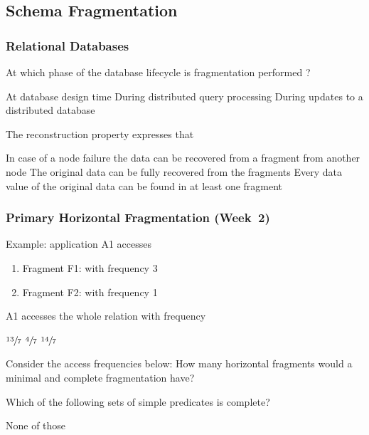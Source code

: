 \documentclass[12pt,a4paper,answers]{exam} %
\begin{document}
\begin{flushleft}
\begin{multicols*}{2}
\begin{questions}
\subsection{Schema Fragmentation}
\subsubsection{Relational Databases}

\question At which phase of the database lifecycle is fragmentation performed ?
\begin{checkboxes}
\CorrectChoice At database design time
\choice During distributed query processing
\choice During updates to a distributed database
\end{checkboxes}

\question The reconstruction property expresses that
\begin{checkboxes}
\choice In case of a node failure the data can be recovered from a fragment from another node
\CorrectChoice The original data can be fully recovered from the fragments
\choice Every data value of the original data can be found in at least one fragment
\end{checkboxes}



\subsubsection{Primary Horizontal Fragmentation (Week~2)} %

\question Example: application A1 accesses
\begin{enumerate}
\item Fragment F1: with frequency 3
\item Fragment F2: with frequency 1
\end{enumerate}
A1 accesses the whole relation with frequency
\begin{checkboxes}
\CorrectChoice $\sfrac{13}{7}$
\choice $\sfrac{4}{7}$
\choice $\sfrac{14}{7}$
\end{checkboxes}

\question Consider the access frequencies below:
How many horizontal fragments would a minimal and complete fragmentation have?
\begin{checkboxes}
\end{checkboxes}

\question Which of the following sets of simple predicates is complete?
\begin{checkboxes}
\CorrectChoice None of those
\end{checkboxes}


\end{questions}
\end{multicols*}
\end{flushleft}
\end{document}

